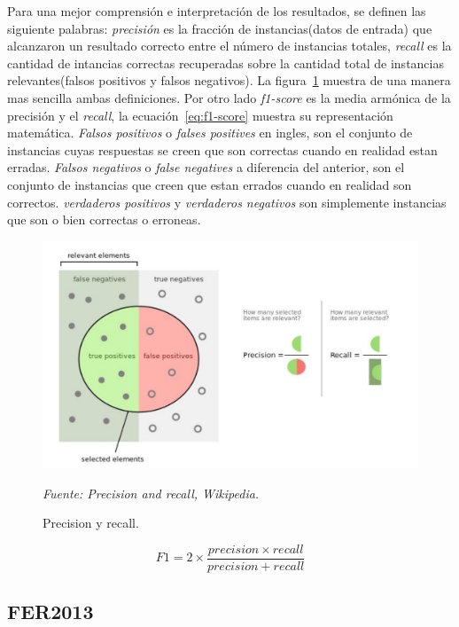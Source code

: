 Para una mejor comprensión e interpretación de los resultados, se definen las siguiente palabras: \textit{precisión} es la fracción de instancias(datos de entrada) que alcanzaron un resultado correcto entre el número de instancias totales, \textit{recall} es la cantidad de intancias correctas recuperadas sobre la cantidad total de instancias relevantes(falsos positivos y falsos negativos). La figura~\ref{fig:precisionRecall} muestra de una manera mas sencilla ambas definiciones. Por otro lado \textit{f1-score} es la media armónica de la precisión y el \textit{recall}, la ecuación~\ref{eq:f1-score} muestra su representación matemática. \textit{Falsos positivos} o \textit{falses positives} en ingles, son el conjunto de instancias cuyas respuestas se creen que son correctas cuando en realidad estan erradas. \textit{Falsos negativos} o \textit{false negatives} a diferencia del anterior, son el conjunto de instancias que creen que estan errados cuando en realidad son correctos. \textit{verdaderos positivos} y \textit{verdaderos negativos} son simplemente instancias que son o bien correctas o erroneas.

\begin{figure}[H]
		\centering
		\includegraphics[width=120mm]{Imagenes/Precisionrecall.pdf}
		\caption{Precision y recall.}
		\vspace{0.15cm}
		\textit{Fuente: Precision and recall, Wikipedia.}
		\label{fig:precisionRecall}
\end{figure}

\begin{equation}\label{eq:f1-score}
F1 = 2\times\frac{precision\times recall}{precision + recall}
\end{equation}

\subsection{FER2013}

